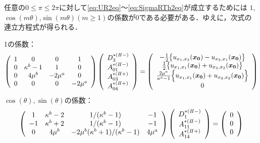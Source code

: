 
任意の$0\leq\pi\leq2\pi$に対して\eqref{eq:UR2eq}～\eqref{eq:SigmaRTh2eq}が成立するためには
$1$,$\cos(m\theta)$,$\sin(m\theta)$$(m\geq1)$の係数が0である必要がある．ゆえに，次式の連立方程式が得られる．

1の係数：
\begin{align}
	\left(
	\begin{array}{cccc}
		1& 0 & 0 & 1 \\
		0 & \kappa^b-1 & 1 & 0 \\
		0 & 4\mu^{b} & -2\mu^{a} & 0 \\
		0 & 0 & 0 & -2\mu^{a} \\
	\end{array}
	\right)
	\left(
	\begin{array}{c}
		D_{3}^{*(I\hspace{-.15em}I-)} \\
	 	A_{01}^{*(I\hspace{-.15em}I-)} \\
		A_{03}^{*(I\hspace{-.15em}I+)}\\
	 	A_{04}^{*(I\hspace{-.15em}I+)} \\
	\end{array}
	\right)
	=
	\left(
	\begin{array}{c}
	 	-\frac{1}{2}\bigl\{u_{x_{1},x_{2}}(\bm{x_{0}})-u_{x_{2},x_{1}}(\bm{x_{0}})\bigr\} \\
		\frac{1}{2}\bigl\{u_{x_{1},x_{1}}(\bm{x_{0}})+u_{x_{2},x_{2}}(\bm{x_{0}})\bigr\} \\
		\frac{2\mu^a}{\kappa^a-1}\Bigl\{ u_{x_{1},x_{1}}(\bm{x_{0}})+ u_{x_{2},x_{2}}(\bm{x_{0}})\Bigr\} \\
	 	0 \\
	\end{array}
	\right)
\end{align}
$\cos(\theta),\sin(\theta)$の係数：
\begin{align}
	\left(
	\begin{array}{cccc}
		1& \kappa^b-2 & 1/(\kappa^b-1) & -1 \\
		-1 & \kappa^b+2 & 1/(\kappa^b-1) & -1 \\
		0 & 4\mu^{b} & -2\mu^{b}(\kappa^b+1)/(\kappa^b-1) & 4\mu^{a} \\
	\end{array}
	\right)
	\left(
	\begin{array}{c}
		D_{1}^{*(I\hspace{-.15em}I-)} \\
	 	A_{11}^{*(I\hspace{-.15em}I-)} \\
	 	A_{14}^{*(I\hspace{-.15em}I+)} \\
	\end{array}
	\right)
	=
	\left(
	\begin{array}{c}
		0 \\
	 	0 \\
	 	0 \\
	\end{array}
	\right)
\end{align}
